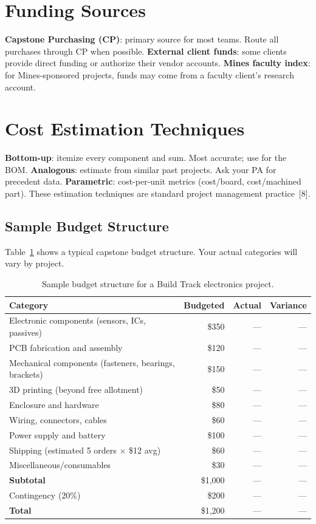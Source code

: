 \section{Funding Sources}
\textbf{Capstone Purchasing (CP)}: primary source for most teams. Route all purchases through CP when possible. \textbf{External client funds}: some clients provide direct funding or authorize their vendor accounts. \textbf{Mines faculty index}: for Mines-sponsored projects, funds may come from a faculty client's research account.

\section{Cost Estimation Techniques}
\textbf{Bottom-up}: itemize every component and sum. Most accurate; use for the BOM. \textbf{Analogous}: estimate from similar past projects. Ask your PA for precedent data. \textbf{Parametric}: cost-per-unit metrics (cost/board, cost/machined part). These estimation techniques are standard project management practice~[8].

\subsection{Sample Budget Structure}
Table~\ref{tab:sample-budget} shows a typical capstone budget structure. Your actual categories will vary by project.

\begin{table}[htbp]
\centering\small
\caption{Sample budget structure for a Build Track electronics project.}\label{tab:sample-budget}
\begin{tabularx}{\textwidth}{Xrrr}
\toprule
\textbf{Category} & \textbf{Budgeted} & \textbf{Actual} & \textbf{Variance} \\
\midrule
Electronic components (sensors, ICs, passives) & \$350 & --- & --- \\
PCB fabrication and assembly & \$120 & --- & --- \\
Mechanical components (fasteners, bearings, brackets) & \$150 & --- & --- \\
3D printing (beyond free allotment) & \$50 & --- & --- \\
Enclosure and hardware & \$80 & --- & --- \\
Wiring, connectors, cables & \$60 & --- & --- \\
Power supply and battery & \$100 & --- & --- \\
Shipping (estimated 5 orders $\times$ \$12 avg) & \$60 & --- & --- \\
Miscellaneous/consumables & \$30 & --- & --- \\
\midrule
\textbf{Subtotal} & \$1,000 & --- & --- \\
Contingency (20\%) & \$200 & --- & --- \\
\midrule
\textbf{Total} & \$1,200 & --- & --- \\
\bottomrule
\end{tabularx}
\end{table}

